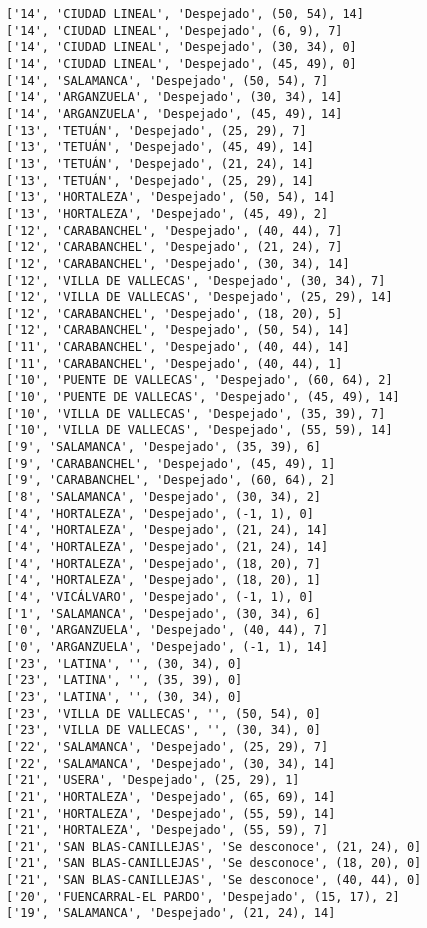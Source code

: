\documentclass[11pt]{article}
\begin{document}
\begin{Verbatim}[commandchars=\\\{\}]
['14', 'CIUDAD LINEAL', 'Despejado', (50, 54), 14]
['14', 'CIUDAD LINEAL', 'Despejado', (6, 9), 7]
['14', 'CIUDAD LINEAL', 'Despejado', (30, 34), 0]
['14', 'CIUDAD LINEAL', 'Despejado', (45, 49), 0]
['14', 'SALAMANCA', 'Despejado', (50, 54), 7]
['14', 'ARGANZUELA', 'Despejado', (30, 34), 14]
['14', 'ARGANZUELA', 'Despejado', (45, 49), 14]
['13', 'TETUÁN', 'Despejado', (25, 29), 7]
['13', 'TETUÁN', 'Despejado', (45, 49), 14]
['13', 'TETUÁN', 'Despejado', (21, 24), 14]
['13', 'TETUÁN', 'Despejado', (25, 29), 14]
['13', 'HORTALEZA', 'Despejado', (50, 54), 14]
['13', 'HORTALEZA', 'Despejado', (45, 49), 2]
['12', 'CARABANCHEL', 'Despejado', (40, 44), 7]
['12', 'CARABANCHEL', 'Despejado', (21, 24), 7]
['12', 'CARABANCHEL', 'Despejado', (30, 34), 14]
['12', 'VILLA DE VALLECAS', 'Despejado', (30, 34), 7]
['12', 'VILLA DE VALLECAS', 'Despejado', (25, 29), 14]
['12', 'CARABANCHEL', 'Despejado', (18, 20), 5]
['12', 'CARABANCHEL', 'Despejado', (50, 54), 14]
['11', 'CARABANCHEL', 'Despejado', (40, 44), 14]
['11', 'CARABANCHEL', 'Despejado', (40, 44), 1]
['10', 'PUENTE DE VALLECAS', 'Despejado', (60, 64), 2]
['10', 'PUENTE DE VALLECAS', 'Despejado', (45, 49), 14]
['10', 'VILLA DE VALLECAS', 'Despejado', (35, 39), 7]
['10', 'VILLA DE VALLECAS', 'Despejado', (55, 59), 14]
['9', 'SALAMANCA', 'Despejado', (35, 39), 6]
['9', 'CARABANCHEL', 'Despejado', (45, 49), 1]
['9', 'CARABANCHEL', 'Despejado', (60, 64), 2]
['8', 'SALAMANCA', 'Despejado', (30, 34), 2]
['4', 'HORTALEZA', 'Despejado', (-1, 1), 0]
['4', 'HORTALEZA', 'Despejado', (21, 24), 14]
['4', 'HORTALEZA', 'Despejado', (21, 24), 14]
['4', 'HORTALEZA', 'Despejado', (18, 20), 7]
['4', 'HORTALEZA', 'Despejado', (18, 20), 1]
['4', 'VICÁLVARO', 'Despejado', (-1, 1), 0]
['1', 'SALAMANCA', 'Despejado', (30, 34), 6]
['0', 'ARGANZUELA', 'Despejado', (40, 44), 7]
['0', 'ARGANZUELA', 'Despejado', (-1, 1), 14]
['23', 'LATINA', '', (30, 34), 0]
['23', 'LATINA', '', (35, 39), 0]
['23', 'LATINA', '', (30, 34), 0]
['23', 'VILLA DE VALLECAS', '', (50, 54), 0]
['23', 'VILLA DE VALLECAS', '', (30, 34), 0]
['22', 'SALAMANCA', 'Despejado', (25, 29), 7]
['22', 'SALAMANCA', 'Despejado', (30, 34), 14]
['21', 'USERA', 'Despejado', (25, 29), 1]
['21', 'HORTALEZA', 'Despejado', (65, 69), 14]
['21', 'HORTALEZA', 'Despejado', (55, 59), 14]
['21', 'HORTALEZA', 'Despejado', (55, 59), 7]
['21', 'SAN BLAS-CANILLEJAS', 'Se desconoce', (21, 24), 0]
['21', 'SAN BLAS-CANILLEJAS', 'Se desconoce', (18, 20), 0]
['21', 'SAN BLAS-CANILLEJAS', 'Se desconoce', (40, 44), 0]
['20', 'FUENCARRAL-EL PARDO', 'Despejado', (15, 17), 2]
['19', 'SALAMANCA', 'Despejado', (21, 24), 14]

\end{Verbatim}
\end{document}
